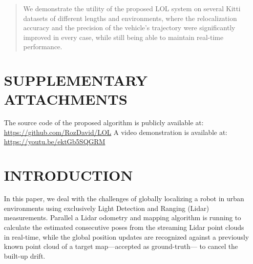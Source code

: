 \documentclass[letterpaper, 10 pt, conference]{ieeeconf}  %
\begin{document}
\begin{abstract}
We demonstrate the utility of the proposed LOL system on several Kitti datasets of different lengths and environments, where the relocalization accuracy and the precision of the vehicle's trajectory were significantly improved in every case, while still being able to maintain real-time performance.

\end{abstract}



\section*{SUPPLEMENTARY ATTACHMENTS}
The source code of the proposed algorithm is publicly available at: \url{https://github.com/RozDavid/LOL}
A video demonstration is available at: \url{https://youtu.be/ektGb5SQGRM}

\section{INTRODUCTION}

In this paper, we deal with the challenges of globally localizing a robot in urban environments using exclusively Light Detection and Ranging (Lidar) measurements. Parallel a Lidar odometry and mapping algorithm is running to calculate the estimated consecutive poses from the streaming Lidar point clouds in real-time, while the global position updates are recognized against a previously known point cloud of a target map---accepted as ground-truth--- to cancel the built-up drift. 
\end{document}
